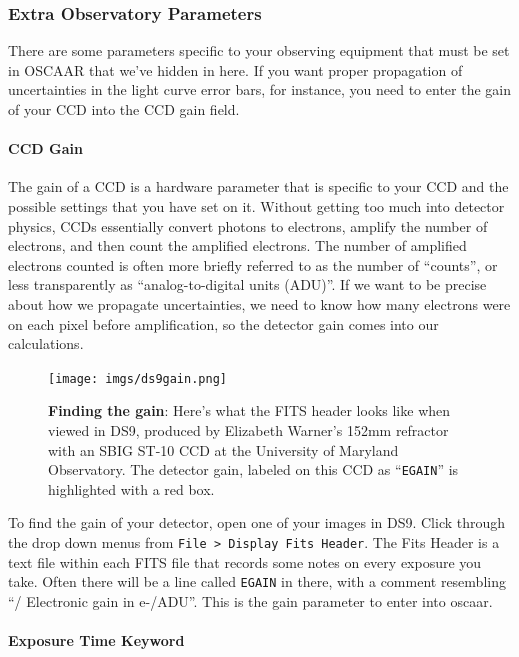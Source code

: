 \documentclass[a4paper]{article}
\newcommand{\code}[1]{\texttt{#1}}
\begin{document}
\subsubsection{Extra Observatory Parameters}
There are some parameters specific to your observing equipment that must be set in OSCAAR that we've hidden in here. If you want proper propagation of uncertainties in the light curve error bars, for instance, you need to enter the gain of your CCD into the CCD gain field. 

\paragraph{CCD Gain}

The gain of a CCD is a hardware parameter that is specific to your CCD and the possible settings that you have set on it. Without getting too much into detector physics, CCDs essentially convert photons to electrons, amplify the number of electrons, and then count the amplified electrons. The number of amplified electrons counted is often more briefly referred to as the number of ``counts'', or less transparently as ``analog-to-digital units (ADU)''. If we want to be precise about how we propagate uncertainties, we need to know how many electrons were on each pixel before amplification, so the detector gain comes into our calculations. 
\begin{figure}[H]
\begin{center}
\texttt{[image: imgs/ds9gain.png]}
\caption{\textbf{Finding the gain}: Here's what the FITS header looks like when viewed in DS9, produced by Elizabeth Warner's 152mm refractor with an SBIG ST-10 CCD at the University of Maryland Observatory. The detector gain, labeled on this CCD as ``\code{EGAIN}'' is highlighted with a red box.}
\label{fig:ccdGain}
\end{center}	
\end{figure}
To find the gain of your detector, open one of your images in DS9. Click through the drop down menus from \code{File > Display Fits Header}. The Fits Header is a text file within each FITS file that records some notes on every exposure you take. Often there will be a line called \code{EGAIN} in there, with a comment resembling ``/ Electronic gain in e-/ADU''. This is the gain parameter to enter into oscaar. 

\paragraph{Exposure Time Keyword}
\end{document}
